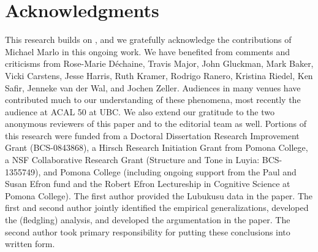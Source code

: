 \documentclass[output=paper]{langscibook}
\begin{document}
\section*{Acknowledgments}

This research builds on \citet{SikukuEtAl:2018:LubukusuOM}, and we gratefully acknowledge the contributions of Michael Marlo in this ongoing work. We have benefited from comments and criticisms from Rose-Marie Déchaine, Travis Major, John Gluckman, Mark Baker, Vicki Carstens, Jesse Harris, Ruth Kramer, Rodrigo Ranero, Kristina Riedel, Ken Safir, Jenneke van der Wal, and Jochen Zeller. Audiences in many venues have contributed much to our understanding of these phenomena, most recently the audience at ACAL 50 at UBC. We also extend our gratitude to the two anonymous reviewers of this paper and to the editorial team as well. Portions of this research were funded from a Doctoral Dissertation Research Improvement Grant (BCS-0843868), a Hirsch Research Initiation Grant from Pomona College, a NSF Collaborative Research Grant (Structure and Tone in Luyia: BCS-1355749), and Pomona College (including ongoing support from the Paul and Susan Efron fund and the Robert Efron Lectureship in Cognitive Science at Pomona College). The first author provided the Lubukusu data in the paper. The first and second author jointly identified the empirical generalizations, developed the (fledgling) analysis, and developed the argumentation in the paper. The second author took primary responsibility for putting these conclusions into written form.

{\sloppy\printbibliography[heading=subbibliography,notkeyword=this]}
\end{document}
